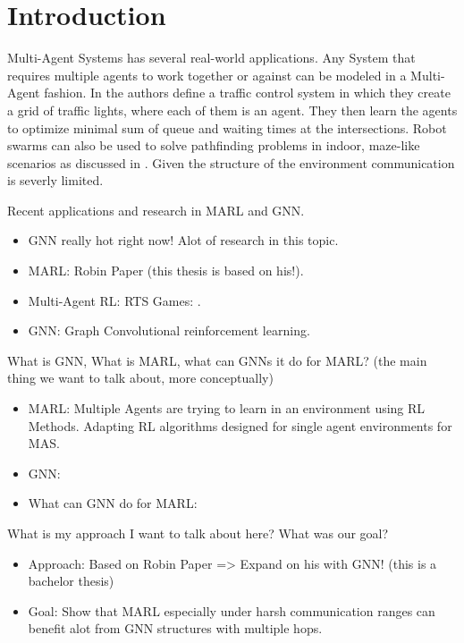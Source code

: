 
\chapter{Introduction}
Multi-Agent Systems has several real-world applications. Any System that requires multiple agents to work together or against can be modeled in a Multi-Agent fashion. In \citet{MARLTraffic2020} the authors define a traffic control system in which they create a grid of traffic lights, where each of them is an agent. They then learn the agents to optimize minimal sum of queue and waiting times at the intersections. Robot swarms can also be used to solve pathfinding problems in indoor, maze-like scenarios as discussed in \citet{SwarmPathFinding2013}. Given the structure of the environment communication is severly limited. 
\par

Recent applications and research in MARL and GNN.
\begin{itemize}[noitemsep,nolistsep]
	\item GNN really hot right now! Alot of research in this topic.
	\item MARL: Robin Paper (this thesis is based on his!). 
	\item Multi-Agent RL: RTS Games: \citet{RTSMARL2021}.
	\item GNN: Graph Convolutional reinforcement learning.
\end{itemize} \par

What is GNN, What is MARL, what can GNNs it do for MARL? (the main thing we want to talk about, more conceptually)
\begin{itemize}[noitemsep,nolistsep]
	\item MARL: Multiple Agents are trying to learn in an environment using RL Methods. Adapting RL algorithms designed for single agent environments for MAS.
	\item GNN: 
	\item What can GNN do for MARL:
\end{itemize} \par

What is my approach I want to talk about here? What was our goal?
\begin{itemize}[noitemsep,nolistsep]
	\item Approach: Based on Robin Paper => Expand on his with GNN! (this is a bachelor thesis) \citet{RobinRuede2021}
	\item Goal: Show that MARL especially under harsh communication ranges can benefit alot from GNN structures with multiple hops.
\end{itemize} \par

